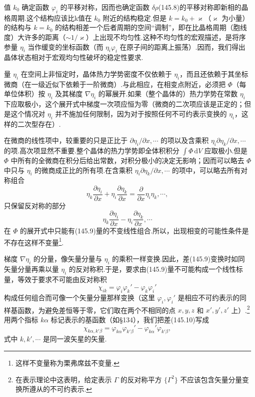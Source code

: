 值 $k_0$ 确定函数 $\varphi_i$ 的平移对称，因而也确定函数 $\delta\rho$(145.8)的平移对称即新相的晶格周期.这个结构应该比k值在 $k_0$ 附近的结构稳定.但是 $k=k_0+\varkappa$（$\varkappa$ 为小量）的结构与 $k=k_0$ 的结构相差一个后者周期的空间“调制”，即在比晶格周期（胞线度）大许多的距离（$\sim1/\varkappa$）上出现不均匀性.这种不均匀性的宏观描述，是将序参量 $\eta_i$ 当作缓变的坐标函数（而 $\eta_i\varphi_i$ 在原子间的距离上振荡）.因而，我们得出晶体状态相对于宏观均匀性破坏的稳定性要求.

量 $\eta_i$ 在空间上非恒定时，晶体热力学势密度不仅依赖于 $\eta_i$，而且还依赖于其坐标微商（在一级近似下依赖于一阶微商）.与此相应，在相变点附近，必须把 $\Phi$（每单位体积）按 $\eta_i$ 及其梯度 $\nabla\eta_i$ 的幂展开.如果（整个晶体的）热力学势在常数 $\eta_i$ 下应取极小，这个展开式中梯度一次项应恒为零（微商的二次项应该是正定的；但是这个情况对 $\eta_i$ 并不施加任何限制，因为对于按照任何不可约表示变换的 $\eta_i$，这样的二次型存在）.

在微商的线性项中，较重要的只是正比于 $\partial\eta_i/\partial x,\cdots$ 的项以及含乘积 $\eta_i\partial\eta_k/\partial x,\cdots$ 的项.高次项显然不重要.整个晶体的热力学势即全体积积分 $\int\Phi\,\mathrm{d}V$ 应取极小.但是 $\Phi$ 中所有的全微商在积分后给出常数，对积分极小的决定无影响；因而可以略去 $\Phi$ 中只与 $\eta_i$ 的微商成正比的所有项.在含乘积 $\eta_i\partial\eta_k/\partial x,\cdots$ 的项中，可以略去所有对称组合
\begin{equation*}
  \eta_k\frac{\partial\eta_i}{\partial x}
  +\eta_i\frac{\partial\eta_k}{\partial x}
  =\frac{\partial}{\partial x}\eta_i\eta_k,\cdots,
\end{equation*}
只保留反对称的部分
\begin{equation}
  \eta_k\frac{\partial\eta_i}{\partial x}
  -\eta_i\frac{\partial\eta_k}{\partial x},\cdots
\end{equation}
在 $\Phi$ 的展开式中只能有(145.9)量的不变线性组合.所以，出现相变的可能性条件是不存在这样不变量\footnote{这样不变量称为栗弗席兹不变量.}.

梯度 $\nabla\eta_i$ 的分量，像矢量分量与 $\eta_i$ 的乘积一样变换.因此，差(145.9)变换时如同矢量分量再乘以量 $\eta_i$ 的反对称积.于是，要求由(145.9)量不可能构成一个线性标量，等效于要求不可能由反对称积
\begin{equation}
  \chi_{ik}=\varphi_i\varphi_k'-\varphi_k\varphi_i'
\end{equation}
构成任何组合而可像一个矢量分量那样变换（这里 $\varphi_i,\varphi_i'$ 是相应不可约表示的同样基函数，为避免差恒等于零，它们取在两个不相同的点 $x,y,z$ 和 $x',y',z'$ 上）.\footnote{在表示理论中这表明，给定表示 $\Gamma$ 的反对称平方 $\{\Gamma^2\}$ 不应该包含矢量分量变换所遵从的不可约表示.}用两个指标 $k\alpha$ 标记表示的基函数（如§134），我们把差(145.10)写成
\begin{equation}
  \chi_{k\alpha,k'\beta}
  =\varphi_{k\alpha}\varphi_{k'\beta}'
  -\varphi_{k\alpha}'\varphi_{k'\beta},
\end{equation}
式中 $k,k',\cdots$ 是同一波矢星的矢量.

